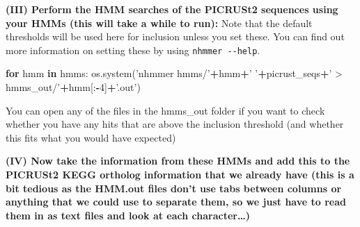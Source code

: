 \documentclass[
]{article}
\newenvironment{Shaded}{\begin{snugshade}}{\end{snugshade}}
\newcommand{\ControlFlowTok}[1]{\textcolor[rgb]{0.13,0.29,0.53}{\textbf{#1}}}
\newcommand{\DecValTok}[1]{\textcolor[rgb]{0.00,0.00,0.81}{#1}}
\newcommand{\KeywordTok}[1]{\textcolor[rgb]{0.13,0.29,0.53}{\textbf{#1}}}
\newcommand{\NormalTok}[1]{#1}
\newcommand{\OperatorTok}[1]{\textcolor[rgb]{0.81,0.36,0.00}{\textbf{#1}}}
\newcommand{\StringTok}[1]{\textcolor[rgb]{0.31,0.60,0.02}{#1}}
\begin{document}
\textbf{(III) Perform the HMM searches of the PICRUSt2 sequences using
your HMMs (this will take a while to run):} Note that the default
thresholds will be used here for inclusion unless you set these. You can
find out more information on setting these by using
\texttt{nhmmer\ -\/-help}.

\begin{Shaded}
\begin{Highlighting}[]
\ControlFlowTok{for}\NormalTok{ hmm }\KeywordTok{in}\NormalTok{ hmms:}
\NormalTok{    os.system(}\StringTok{'nhmmer hmms/'}\OperatorTok{+}\NormalTok{hmm}\OperatorTok{+}\StringTok{' '}\OperatorTok{+}\NormalTok{picrust_seqs}\OperatorTok{+}\StringTok{' > hmms_out/'}\OperatorTok{+}\NormalTok{hmm[:}\OperatorTok{-}\DecValTok{4}\NormalTok{]}\OperatorTok{+}\StringTok{'.out'}\NormalTok{)}
\end{Highlighting}
\end{Shaded}

You can open any of the files in the hmms\_out folder if you want to
check whether you have any hits that are above the inclusion threshold
(and whether this fits what you would have expected)

\textbf{(IV) Now take the information from these HMMs and add this to
the PICRUSt2 KEGG ortholog information that we already have (this is a
bit tedious as the HMM.out files don't use tabs between columns or
anything that we could use to separate them, so we just have to read
them in as text files and look at each character\ldots)}
\end{document}
